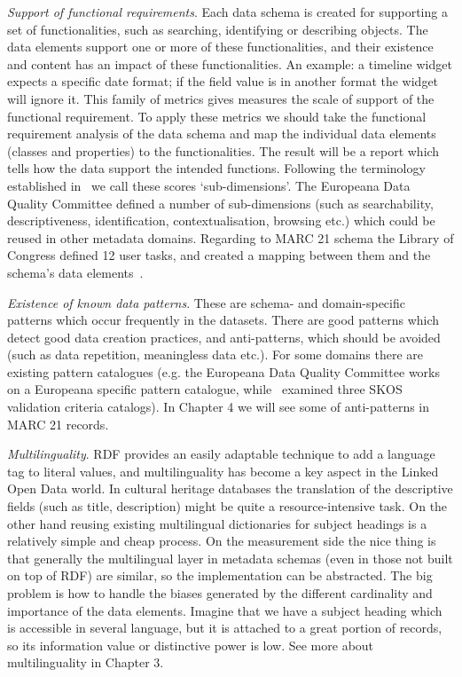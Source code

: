 \emph{Support of functional requirements}. Each data schema is created for supporting a set of functionalities, such as searching, identifying or describing objects. The data elements support one or more of these functionalities, and their existence and content has an impact of these functionalities. An example: a timeline widget expects a specific date format; if the field value is in another format the widget will ignore it. This family of metrics gives measures the scale of support of the functional requirement. To apply these metrics we should take the functional requirement analysis of the data schema and map the individual data elements (classes and properties) to the functionalities. The result will be a report which tells how the data support the intended functions. Following the terminology established in~\cite{gavrilis2015} we call these scores `sub-dimensions’. The Europeana Data Quality Committee defined a number of sub-dimensions (such as searchability, descriptiveness, identification, contextualisation, browsing etc.) which could be reused in other metadata domains. Regarding to MARC 21 schema the Library of Congress defined 12 user tasks, and created a mapping between them and the schema's data elements~\cite{delsey2003, loc2006}.

\emph{Existence of known data patterns}. These are schema- and domain-specific patterns which occur frequently in the datasets. There are good patterns which detect good data creation practices, and anti-patterns, which should be avoided (such as data repetition, meaningless data etc.). For some domains there are existing pattern catalogues (e.g. the Europeana Data Quality Committee works on a Europeana specific pattern catalogue, while~\cite{suominen2012}  examined three SKOS validation criteria catalogs). In Chapter 4 we will see some of anti-patterns in MARC 21 records.

\emph{Multilinguality}. RDF provides an easily adaptable technique to add a language tag to literal values, and multilinguality has become a key aspect in the Linked Open Data world. In cultural heritage databases the translation of the descriptive fields (such as title, description) might be quite a resource-intensive task. On the other hand reusing existing multilingual dictionaries for subject headings is a relatively simple and cheap process. On the measurement side the nice thing is that generally the multilingual layer in metadata schemas (even in those not built on top of RDF) are similar, so the implementation can be abstracted. The big problem is how to handle the biases generated by the different cardinality and importance of the data elements. Imagine that we have a subject heading which is accessible in several language, but it is attached to a great portion of records, so its information value or distinctive power is low. See more about multilinguality in Chapter 3.

